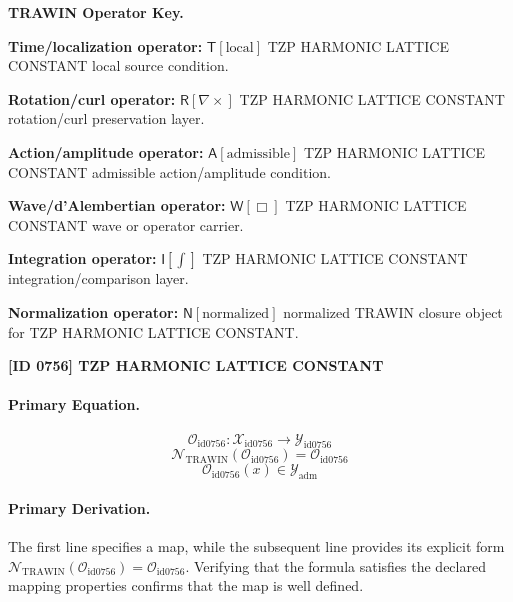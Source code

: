 \par\vspace{0.45\baselineskip}
\noindent\begin{minipage}[t]{\linewidth}
\begingroup
\small
\raggedright
\textbf{TRAWIN Operator Key.}\par
\noindent\textbf{Time/localization operator:} $\mathsf{T}\!\left[\mathrm{local}\right]$ TZP HARMONIC LATTICE CONSTANT local source condition.\par
\noindent\textbf{Rotation/curl operator:} $\mathsf{R}\!\left[\nabla\times\right]$ TZP HARMONIC LATTICE CONSTANT rotation/curl preservation layer.\par
\noindent\textbf{Action/amplitude operator:} $\mathsf{A}\!\left[\mathrm{admissible}\right]$ TZP HARMONIC LATTICE CONSTANT admissible action/amplitude condition.\par
\noindent\textbf{Wave/d'Alembertian operator:} $\mathsf{W}\!\left[\Box\right]$ TZP HARMONIC LATTICE CONSTANT wave or operator carrier.\par
\noindent\textbf{Integration operator:} $\mathsf{I}\!\left[\int\right]$ TZP HARMONIC LATTICE CONSTANT integration/comparison layer.\par
\noindent\textbf{Normalization operator:} $\mathsf{N}\!\left[\mathrm{normalized}\right]$ normalized TRAWIN closure object for TZP HARMONIC LATTICE CONSTANT.\par
\endgroup
\end{minipage}

\clearpage
\noindent\textbf{[ID 0756] TZP HARMONIC LATTICE CONSTANT}\par
\vspace{0.35em}
\paragraph{Primary Equation.}
\[
\mathcal{O}_{\mathrm{id0756}}:\mathcal{X}_{\mathrm{id0756}}\longrightarrow\mathcal{Y}_{\mathrm{id0756}}
\]
\[
\mathcal{N}_{\mathrm{TRAWIN}}(\mathcal{O}_{\mathrm{id0756}})=\mathcal{O}_{\mathrm{id0756}}
\]
\[
\mathcal{O}_{\mathrm{id0756}}(x)\in\mathcal{Y}_{\mathrm{adm}}
\]

\paragraph{Primary Derivation.}
The first line specifies a map, while the subsequent line provides its explicit form \( \mathcal{N}_{\mathrm{TRAWIN}}(\mathcal{O}_{\mathrm{id0756}})=\mathcal{O}_{\mathrm{id0756}} \). Verifying that the formula satisfies the declared mapping properties confirms that the map is well defined.
